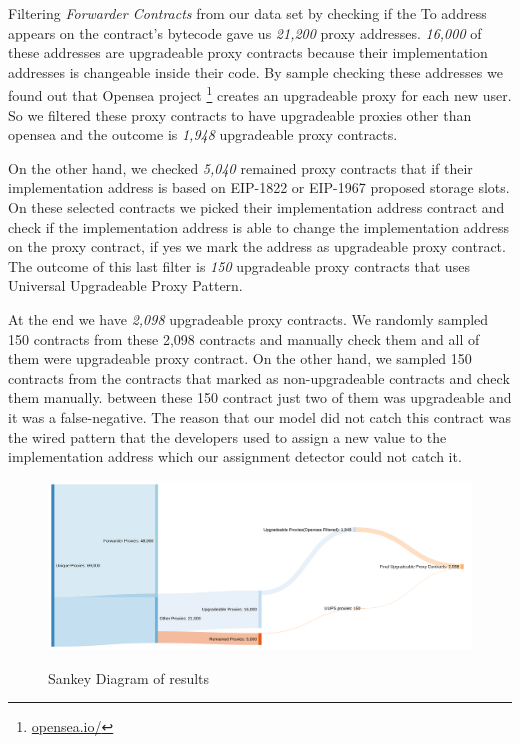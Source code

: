 Filtering \textit{Forwarder Contracts} from our data set by checking if the To address appears on the contract's bytecode gave us \textit{21,200} proxy addresses. \textit{16,000} of these addresses are upgradeable proxy contracts because their implementation addresses is changeable inside their code. By sample checking these addresses we found out that Opensea project \footnote{\url{opensea.io/}} creates an upgradeable proxy for each new user. So we filtered these proxy contracts to have upgradeable proxies other than opensea and the outcome is \textit{1,948} upgradeable proxy contracts. 

On the other hand, we checked \textit{5,040} remained proxy contracts that if their implementation address is based on EIP-1822 or EIP-1967 proposed storage slots. On these selected contracts we picked their implementation address contract and check if the implementation address is able to change the implementation address on the proxy contract, if yes we mark the address as upgradeable proxy contract. The outcome of this last filter is \textit{150} upgradeable proxy contracts that uses Universal Upgradeable Proxy Pattern. 

At the end we have \textit{2,098} upgradeable proxy contracts. We randomly sampled 150 contracts from these 2,098 contracts and manually check them and all of them were upgradeable proxy contract. On the other hand, we sampled 150 contracts from the contracts that marked as non-upgradeable contracts and check them manually. between these 150 contract just two of them was upgradeable and it was a false-negative. The reason that our model did not catch this contract was the wired pattern that the developers used to assign a new value to the implementation address which our assignment detector could not catch it. 

\begin{figure}[t]
  \includegraphics[width=1.2\textwidth]{figures/sankeyDiagram.png}\label{sankey}
  \caption{Sankey Diagram of results}
\end{figure}


